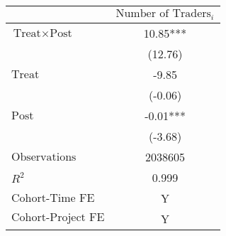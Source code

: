 \begin{tabular}{lc}
\toprule
& $\text{Number of Traders}_{i}$ \\
\midrule
$\text{Treat} \times \text{Post}$ & 10.85*** \\
 & (12.76) \\
$\text{Treat}$ & -9.85 \\
 & (-0.06) \\
$\text{Post}$ & -0.01*** \\
 & (-3.68) \\
\midrule
$\text{Observations}$ & 2038605 \\
$R^2$ & 0.999 \\
$\text{Cohort-Time FE}$ & Y \\
$\text{Cohort-Project FE}$ & Y \\
\bottomrule
\end{tabular}
